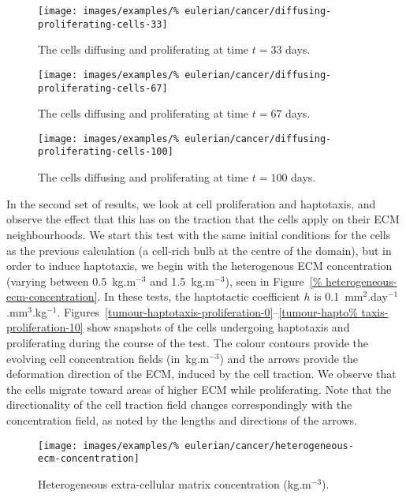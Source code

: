 \begin{figure}[!hptb]
  \centering
  \texttt{[image: images/examples/\%
    eulerian/cancer/diffusing-proliferating-cells-33]}
  \caption{The cells diffusing and proliferating at time $t=33$ days.}
  \label{tumour-diffusion-proliferation-33}
\end{figure}

\begin{figure}[!hptb]
  \centering
  \texttt{[image: images/examples/\%
    eulerian/cancer/diffusing-proliferating-cells-67]}
  \caption{The cells diffusing and proliferating at time $t=67$ days.}
  \label{tumour-diffusion-proliferation-67}
\end{figure}

\begin{figure}[!hptb]
  \centering
  \texttt{[image: images/examples/\%
    eulerian/cancer/diffusing-proliferating-cells-100]}
  \caption{The cells diffusing and proliferating at time $t=100$ days.}
  \label{tumour-diffusion-proliferation-100}
\end{figure}

\clearpage

In the second set of results, we look at cell proliferation and
haptotaxis, and observe the effect that this has on the traction that
the cells apply on their ECM neighbourhoods. We start this test with
the same initial conditions for the cells as the previous calculation
(a cell-rich bulb at the centre of the domain), but in order to induce
haptotaxis, we begin with the heterogenous ECM concentration (varying
between 0.5~kg.m$^{-3}$ and 1.5~kg.m$^{-3}$), seen in Figure~\ref{%
  heterogeneous-ecm-concentration}. In these tests, the haptotactic
coefficient $h$ is 0.1~mm$^2$.day$^{-1}$.mm$^3$.kg$^{-1}$.
Figures~\ref{tumour-haptotaxis-proliferation-0}--\ref{tumour-hapto%
  taxis-proliferation-10} show snapshots of the cells undergoing
haptotaxis and proliferating during the course of the test. The colour
contours provide the evolving cell concentration fields
(in~kg.m$^{-3}$) and the arrows provide the deformation direction of
the ECM, induced by the cell traction. We observe that the cells
migrate toward areas of higher ECM while proliferating. Note that the
directionality of the cell traction field changes correspondingly with
the concentration field, as noted by the lengths and directions of the
arrows.

\begin{figure}[!hptb]
  \centering
  \texttt{[image: images/examples/\%
    eulerian/cancer/heterogeneous-ecm-concentration]}
  \caption{Heterogeneous extra-cellular matrix concentration
    (kg.m$^{-3}$).}
  \label{heterogeneous-ecm-concentration}
\end{figure}

